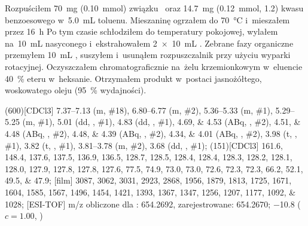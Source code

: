 Rozpuściłem \SI{70}{\milli\gram} (\SI{0.10}{\milli\mol}) związku~ oraz
  \SI{14.7}{\milli\gram} (\SI{0.12}{\milli\mol}, \SI{1.2}{\equiv}) kwasu benzoesowego
  w~\SI{5.0}{\milli\liter} toluenu.
Mieszaninę ogrzałem do \SI{70}{\degreeCelsius} i~mieszałem przez \SI{16}{\hour}
Po tym czasie schłodziłem do temperatury pokojowej, wylałem na~\SI{10}{\milli\liter} nasyconego
   i~ekstrahowałem \SI[product-units = single]{2 x 10}{\mL} .
Zebrane fazy organiczne przemyłem \SI{10}{\mL} , suszyłem  i~usunąłem
  rozpuszczalnik przy użyciu wyparki rotacyjnej.
Oczyszczałem chromatograficznie na~żelu krzemionkowym w~eluencie \SI{40}{\percent} eteru  w~heksanie.
Otrzymałem produkt w~postaci jasnożółtego, woskowatego oleju (\SI{95}{\percent} wydajności).

\begin{fullexp}
  \NMR(600)[CDCl3] \numrange{7.37}{7.13} (m, \#{18}), \numrange{6.80}{6.77} (m, \#{2}), \numrange{5.36}{5.33} (m, \#{1}), \numrange{5.29}{5.25} (m, \#{1}), \num{5.01} (dd, , \#{1}), \num{4.83} (dd, , \#{1}), \numlist{4.69;4.53} (ABq, , \#{2}), \numlist{4.51;4.48} (ABq, , \#{2}), \numlist{4.48;4.39} (ABq, , \#{2}), \numlist{4.34;4.01} (ABq, , \#{2}), \num{3.98} (t, , \#{1}), \num{3.82} (t, , \#{1}), \numrange{3.81}{3.78} (m, \#{2}), \num{3.68} (dd, , \#{1});
  (151)[CDCl3] \numlist{161.6; 148.4; 137.6; 137.5; 136.9; 136.5; 128.7; 128.5; 128.4; 128.4; 128.3; 128.2; 128.1; 128.0; 127.9; 127.8; 127.8; 127.6; 77.5; 74.9; 73.0; 73.0; 72.6; 72.3; 72.3; 66.2; 52.1; 49.5; 47.9};
  [film] \numlist{3087; 3062; 3031; 2923; 2868; 1956; 1879; 1813; 1725; 1671; 1604; 1585; 1567; 1496; 1454; 1421; 1393; 1367; 1347; 1256; 1207; 1177; 1092; 1028};
  [ESI-TOF] m/z obliczone dla : \num{654.2692}, zarejestrowane: \num{654.2670};
  \data{[$\alpha^{23}_D$]~$=$} \num{-10.8} ($c = 1.00$, )
\end{fullexp}

